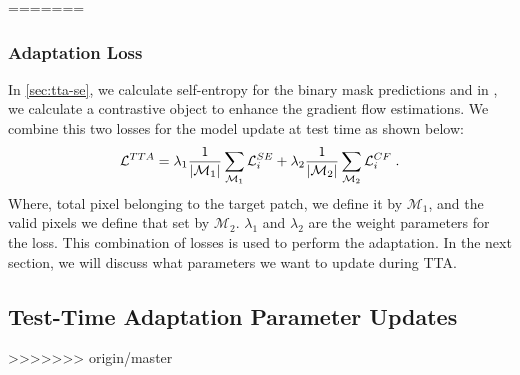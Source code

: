 =======
\subsubsection{Adaptation Loss}
In \cref{sec:tta-se}, we calculate self-entropy for the binary mask predictions and in , we calculate a contrastive object to enhance the gradient flow estimations. We combine this two losses for the model update at test time as shown below:
\begin{equation}
    \small
    \mathcal{L}^{TTA} = \lambda_1\frac{1}{| \mathcal{M}_1 |} \sum_{\mathcal{M}_{1}} \mathcal{L}^{SE}_i + \lambda_2\frac{1}{| \mathcal{M}_2 |} \sum_{\mathcal{M}_2} \mathcal{L}^{CF}_i \; .
    \label{eq-tta-loss}
  \end{equation}
Where, total pixel belonging to the target patch, we define it by $\mathcal{M}_1$, and the valid pixels we define that set by $\mathcal{M}_2$. $\lambda_1$ and $\lambda_2$ are the weight parameters for the loss. This combination of losses is used to perform the adaptation. In the next section, we will discuss what parameters we want to update during TTA. 

\subsection{Test-Time Adaptation Parameter Updates}
>>>>>>> origin/master
